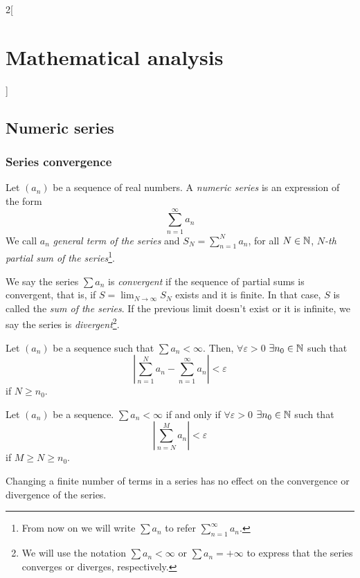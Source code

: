 \documentclass[../../../main_math.tex]{subfiles}
\begin{document}
\begin{multicols}{2}[\section{Mathematical analysis}]
  \subsection{Numeric series}
  \subsubsection{Series convergence}
  \begin{definition}
    Let $(a_n)$ be a sequence of real numbers. A \emph{numeric series} is an expression of the form $$\sum_{n=1}^\infty a_n$$ We call $a_n$ \emph{general term of the series} and $\displaystyle S_N=\sum_{n=1}^N a_n$, for all $N\in\mathbb{N} $, \emph{$N$-th partial sum of the series}\footnote{From now on we will write $\sum a_n$ to refer $\displaystyle\sum_{n=1}^\infty a_n$.}.
  \end{definition}
  \begin{definition}
    We say the series $\sum a_n$ is \emph{convergent} if the sequence of partial sums is convergent, that is, if $\displaystyle S=\lim_{N\to\infty}S_N$ exists and it is finite. In that case, $S$ is called the \emph{sum of the series}. If the previous limit doesn't exist or it is infinite, we say the series is \emph{divergent}\footnote{We will use the notation $\sum a_n<\infty$ or $\sum a_n=+\infty$ to express that the series converges or diverges, respectively.}.
  \end{definition}
  \begin{proposition}
    Let $(a_n)$ be a sequence such that $\sum a_n<\infty$. Then, $\forall\varepsilon>0$ $\exists n_0\in\mathbb{N} $ such that $$\left|\sum_{n=1}^N a_n-\sum_{n=1}^\infty a_n\right|<\varepsilon$$ if $N\geq n_0$.
  \end{proposition}
  \begin{theorem}
    Let $(a_n)$ be a sequence. $\sum a_n<\infty$ if and only if $\forall\varepsilon>0$ $\exists n_0\in\mathbb{N} $ such that $$\left|\sum_{n=N}^Ma_n\right|<\varepsilon$$ if $M\geq N\geq n_0$.
  \end{theorem}
  \begin{corollary}
    Changing a finite number of terms in a series has no effect on the convergence or divergence of the series.
  \end{corollary}

\end{multicols}
\end{document}
